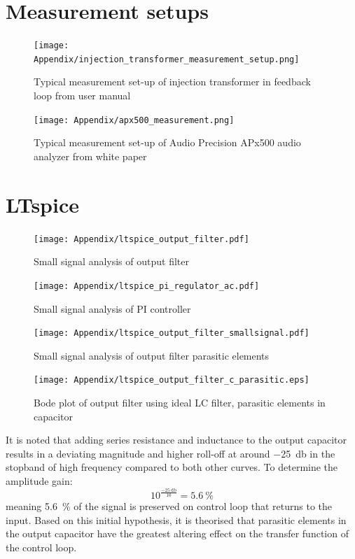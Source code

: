 \chapter{Measurement setups}
\begin{figure}[H]
	\centering
	\texttt{[image: Appendix/injection\_transformer\_measurement\_setup.png]}
	\caption{Typical measurement set-up of injection transformer in feedback loop from user manual \cite{injection_transformer_manual}}
	\label{fig:injection_transformer_setup}
\end{figure}

\begin{figure}[H]
	\centering
	\texttt{[image: Appendix/apx500\_measurement.png]}
	\caption{Typical measurement set-up of Audio Precision APx500 audio analyzer from white paper \cite{apx500_sw_mode_meas}}
	\label{fig:apx500_typical_measurement}
\end{figure}

\chapter{LTspice}

\begin{figure}[H]
	\centering
	\texttt{[image: Appendix/ltspice\_output\_filter.pdf]}
	\caption{Small signal analysis of output filter}
	\label{fig:ltspice_output_filter}
\end{figure}

\begin{figure}[H]
	\centering
	\texttt{[image: Appendix/ltspice\_pi\_regulator\_ac.pdf]}
	\caption{Small signal analysis of PI controller}
	\label{fig:ltspice_pi_regulator_ac}
\end{figure}

\begin{figure}[H]
	\centering
	\texttt{[image: Appendix/ltspice\_output\_filter\_smallsignal.pdf]}
	\caption{Small signal analysis of output filter parasitic elements}
	\label{fig:ltspice_output_filter_smallsignal}
\end{figure}

\begin{figure}[htbp]
	\centering
	\texttt{[image: Appendix/ltspice\_output\_filter\_c\_parasitic.eps]}
	\caption{Bode plot of output filter using ideal LC filter, parasitic elements in capacitor}
	\label{fig:ltspice_output_filter_c_parasitic}
\end{figure}

It is noted that adding series resistance and inductance to the output capacitor results in a deviating magnitude and higher roll-off at around \SI{-25}{\decibel} in the stopband of high frequency compared to both other curves. To determine the amplitude gain: $$10^{\frac{\SI{-25}{\decibel}}{10}} = \SI{5.6}{\percent}$$ meaning \SI{5.6}{\percent} of the signal is preserved on control loop that returns to the input. Based on this initial hypothesis, it is theorised that parasitic elements in the output capacitor have the greatest altering effect on the transfer function of the control loop.

